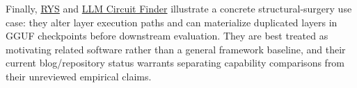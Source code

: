 Finally, \href{https://dnhkng.github.io/posts/rys/}{RYS} and
\href{https://github.com/alainnothere/llm-circuit-finder}{LLM Circuit Finder}
illustrate a concrete structural-surgery use case: they alter layer execution
paths and can materialize duplicated layers in GGUF checkpoints before downstream
evaluation. They are best treated as motivating related software rather than a
general framework baseline, and their current blog/repository status warrants
separating capability comparisons from their unreviewed empirical claims.
